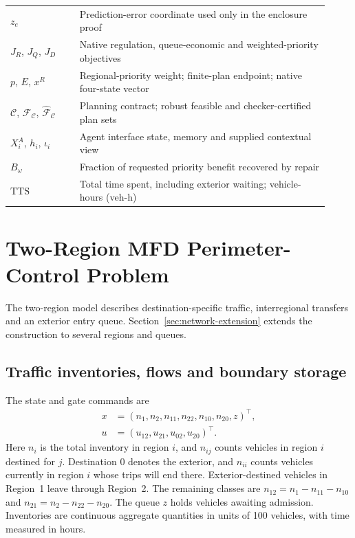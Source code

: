 \documentclass[preprint,12pt]{elsarticle}
\begin{document}
\begin{table}[!tp]
\begin{tabular}{@{}p{0.20\linewidth}p{0.72\linewidth}@{}}
$z_e$ & Prediction-error coordinate used only in the enclosure proof\\
$J_R$, $J_Q$, $J_D$ & Native regulation, queue-economic and weighted-priority objectives\\
$p$, $E$, $x^R$ & Regional-priority weight; finite-plan endpoint; native four-state vector\\
$\mathcal C$, $\mathcal F_{\mathcal C}$, $\widehat{\mathcal F}_{\mathcal C}$ & Planning contract; robust feasible and checker-certified plan sets\\
$X_i^A$, $h_i$, $\iota_i$ & Agent interface state, memory and supplied contextual view\\
$B_\omega$ & Fraction of requested priority benefit recovered by repair\\
$\mathrm{TTS}$ & Total time spent, including exterior waiting; vehicle-hours (veh-h)\\
\bottomrule
\end{tabular}
\end{table}

\section{Two-Region MFD Perimeter-Control Problem}
\label{sec:new-problem}

The two-region model describes destination-specific traffic, interregional
transfers and an exterior entry queue. Section~\ref{sec:network-extension}
extends the construction to several regions and queues.

\subsection{Traffic inventories, flows and boundary storage}
\label{app:new-model}

The state and gate commands are
\begin{equation}
\begin{aligned}
x&=(n_1,n_2,n_{11},n_{22},n_{10},n_{20},z)^\top,\\
u&=(u_{12},u_{21},u_{02},u_{20})^\top.
\end{aligned}
\label{eq:new-state}
\end{equation}
Here $n_i$ is the total inventory in region $i$, and $n_{ij}$ counts vehicles
in region $i$ destined for $j$. Destination $0$ denotes the exterior, and
$n_{ii}$ counts vehicles currently in region $i$ whose trips will end there.
Exterior-destined vehicles in
Region~1 leave through Region~2. The remaining classes are
$n_{12}=n_1-n_{11}-n_{10}$ and $n_{21}=n_2-n_{22}-n_{20}$.
The queue $z$ holds vehicles awaiting admission. Inventories are continuous
aggregate quantities in units of 100 vehicles, with time measured in hours.
\end{document}
